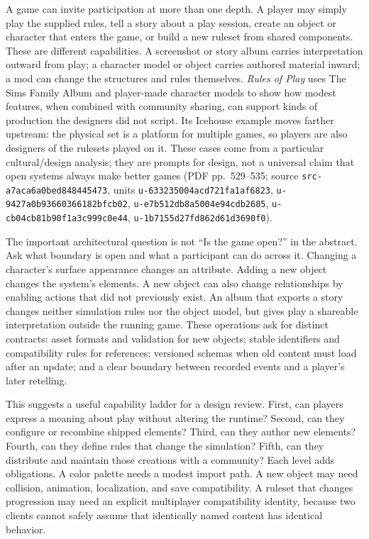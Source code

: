 \hypertarget{06-engine-ii-ch046-design-a-game-system-that-can-be-continued-by-players}{}

A game can invite participation at more than one depth. A player may simply play the supplied rules, tell a story about a play session, create an object or character that enters the game, or build a new ruleset from shared components. These are different capabilities. A screenshot or story album carries interpretation outward from play; a character model or object carries authored material inward; a mod can change the structures and rules themselves. \emph{Rules of Play} uses The Sims Family Album and player-made character models to show how modest features, when combined with community sharing, can support kinds of production the designers did not script. Its Icehouse example moves farther upstream: the physical set is a platform for multiple games, so players are also designers of the rulesets played on it. These cases come from a particular cultural/design analysis; they are prompts for design, not a universal claim that open systems always make better games (PDF pp.~529--535; source \texttt{src-a7aca6a0bed848445473}, units \texttt{u-633235004acd721fa1af6823}, \texttt{u-9427a0b93660366182bfcb02}, \texttt{u-e7b512db8a5004e94cdb2685}, \texttt{u-cb04cb81b90f1a3c999c0e44}, \texttt{u-1b7155d27fd862d61d3690f0}).

The important architectural question is not ``Is the game open?'' in the abstract. Ask what boundary is open and what a participant can do across it. Changing a character's surface appearance changes an attribute. Adding a new object changes the system's elements. A new object can also change relationships by enabling actions that did not previously exist. An album that exports a story changes neither simulation rules nor the object model, but gives play a shareable interpretation outside the running game. These operations ask for distinct contracts: asset formats and validation for new objects; stable identifiers and compatibility rules for references; versioned schemas when old content must load after an update; and a clear boundary between recorded events and a player's later retelling.

This suggests a useful capability ladder for a design review. First, can players express a meaning about play without altering the runtime? Second, can they configure or recombine shipped elements? Third, can they author new elements? Fourth, can they define rules that change the simulation? Fifth, can they distribute and maintain those creations with a community? Each level adds obligations. A color palette needs a modest import path. A new object may need collision, animation, localization, and save compatibility. A ruleset that changes progression may need an explicit multiplayer compatibility identity, because two clients cannot safely assume that identically named content has identical behavior.

